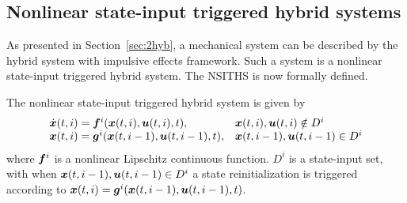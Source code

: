 \documentclass[../DC2017114Bouma.tex]{subfiles}
\begin{document}
\subsection{Nonlinear state-input triggered hybrid systems}
As presented in Section~\ref{sec:2hyb}, a mechanical system can be described by the hybrid system with impulsive effects framework. Such a system is a nonlinear state-input triggered hybrid system. The NSITHS is now formally defined.

\begin{mydef}[NSITHS]\label{def:3nsiths}
The nonlinear state-input triggered hybrid system is given by
\begin{equation}
\begin{array}{ll}
\dot{{\boldsymbol{x}}}(t,i) ={\boldsymbol{f}}^i({\boldsymbol{x}}(t,i),{\boldsymbol{u}}(t,i),t),& {\boldsymbol{x}}(t,i),{\boldsymbol{u}}(t,i)\notin D^i\\
{\boldsymbol{x}}(t,i) = {\boldsymbol{g}}^i({\boldsymbol{x}}(t,i-1),{\boldsymbol{u}}(t,i-1),t),& {\boldsymbol{x}}(t,i-1),{\boldsymbol{u}}(t,i-1)\in D^i
\end{array}\label{eq:3hybimp}
\end{equation}
where ${\boldsymbol{f}}^i$ is a nonlinear Lipschitz continuous function. $D^i$ is a state-input set, with when ${\boldsymbol{x}}(t,i-1),{\boldsymbol{u}}(t,i-1)\in D^i$ a state reinitialization is triggered according to ${\boldsymbol{x}}(t,i) = {\boldsymbol{g}}^i({\boldsymbol{x}}(t,i-1),{\boldsymbol{u}}(t,i-1),t)$.
\end{mydef} 
\end{document}
